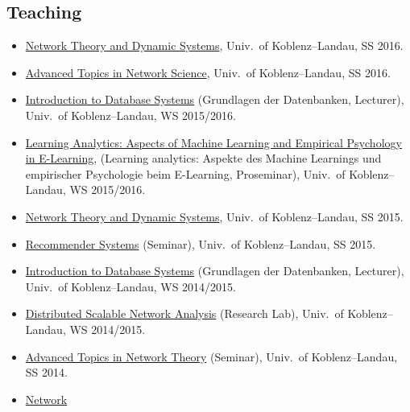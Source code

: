 \documentclass[line,margin]{res}
\begin{document}
\begin{resume}
\section{Teaching}
\begin{itemize}
\item 
  \href{https://west.uni-koblenz.de/en/studying/courses/ss16/network-theory-and-dynamic-systems}{Network
    Theory and Dynamic Systems}, Univ.\ of Koblenz--Landau, SS 2016.
\item
  \href{https://west.uni-koblenz.de/en/studying/courses/ss16/seminar}{Advanced
    Topics in Network Science}, Univ.\ of Koblenz--Landau, SS 2016. 
\item
  \href{https://west.uni-koblenz.de/en/studium/lehrveranstaltungen/ws1516/grundlagen-der-datenbanken}{Introduction
    to Database Systems} (Grundlagen der Datenbanken, 
  Lecturer), Univ.\ of Koblenz--Landau, WS 2015/2016.
\item 
  \href{https://west.uni-koblenz.de/en/studium/lehrveranstaltungen/ws1516/proseminar-learning-analytics}{Learning
  Analytics: Aspects of Machine Learning and Empirical Psychology in E-Learning}, (Learning
    analytics: Aspekte des Machine Learnings und empirischer Psychologie
    beim E-Learning, Proseminar), Univ.\ of Koblenz--Landau, WS 2015/2016.
\item 
  \href{https://west.uni-koblenz.de/en/studium/lehrveranstaltungen/ss15/network-theory-dynamic-systems}{Network
    Theory and Dynamic Systems}, Univ.\ of Koblenz--Landau, SS 2015.
\item
  \href{https://west.uni-koblenz.de/en/studium/lehrveranstaltungen/ss15/recommender-systems}{Recommender
    Systems} (Seminar), Univ.\ of Koblenz--Landau, SS 2015.
\item
  \href{https://web.west.uni-koblenz.de/en/studium/lehrveranstaltungen/ws1415/gddb}{Introduction
    to Database Systems} (Grundlagen der Datenbanken, 
  Lecturer), Univ.\ of Koblenz--Landau, WS 2014/2015.
\item
  \href{https://web.west.uni-koblenz.de/en/studium/lehrveranstaltungen/ws1415/forschungspraktikum}{Distributed
    Scalable Network Analysis} (Research Lab), Univ.\ of
  Koblenz--Landau, WS 2014/2015. 
\item
  \href{http://www.uni-koblenz-landau.de/campus-koblenz/fb4/west/teaching/ss14/seminar}{Advanced
    Topics in Network Theory} (Seminar), Univ.\ of Koblenz--Landau, SS 2014. 
\item 
  \href{http://www.uni-koblenz-landau.de/campus-koblenz/fb4/west/teaching/ss14/network-theory-and-dynamic-systems}{Network
}
\end{itemize}
\end{resume}
\end{document}
